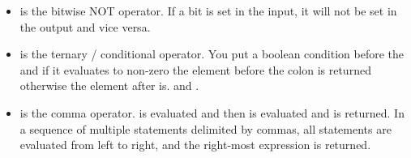 \begin{itemize}
	\item \keyword{~~} is the bitwise NOT operator.
    If a bit is set in the input, it will not be set in the output and vice versa.
	\item {} is the ternary / conditional operator.
    You put a boolean condition before the \? and if it evaluates to non-zero the element before the colon is returned otherwise the element after is.
     and .
	\item {} is the comma operator.
     is evaluated and then  is evaluated and  is returned.
    In a sequence of multiple statements delimited by commas, all statements are evaluated from left to right, and the right-most expression is returned.
\end{itemize}

